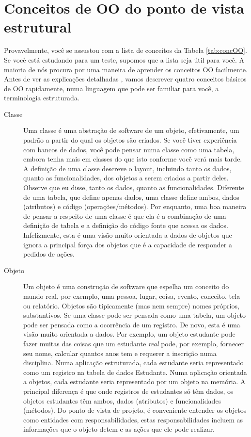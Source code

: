 \documentclass[
	11pt,				%
	openright,
	twoside,			%
	a4paper,			%
	english,			%
	french,
	brazil,				%
	sumario=tradicional
	]{abntex2}
\begin{document}
\section{Conceitos de OO do ponto de vista estrutural}

Provavelmente, você se assustou com a lista de conceitos da Tabela \ref{tab:concOO}. Se você está estudando para um teste, supomos que a lista seja útil para você. A maioria de nós procura por uma maneira de aprender os conceitos OO facilmente. Antes de ver as explicações detalhadas , vamos descrever quatro conceitos básicos de OO rapidamente, numa linguagem que pode ser familiar para você, a terminologia estruturada.

\begin{description}
\item[Classe] Uma classe é uma abstração de software de um objeto, efetivamente, um padrão a partir do qual os objetos são criados. Se você tiver experiência com bancos de dados, você pode pensar numa classe como uma tabela, embora tenha mais em classes do que isto conforme você verá mais tarde. A definição de uma classe descreve o layout, incluindo tanto os dados, quanto as funcionalidades, dos objetos a serem criados a partir deles. Observe que eu disse, tanto os dados, quanto as funcionalidades. Diferente de uma tabela, que define apenas dados, uma classe define ambos, dados (atributos) e código (operações/métodos). Por enquanto, uma boa maneira de pensar a respeito de uma classe é que ela é a combinação de uma definição de tabela e a definição do código fonte que acessa os dados. Infelizmente, esta é uma visão muito orientada a dados de objetos que ignora a principal força dos objetos que é a capacidade de responder a pedidos de ações.

\item[Objeto] Um objeto é uma construção de software que espelha um conceito do mundo real, por exemplo, uma pessoa, lugar, coisa, evento, conceito, tela ou relatório. Objetos são tipicamente (mas nem sempre) nomes próprios, substantivos. Se uma classe pode ser pensada como uma tabela, um objeto pode ser pensada como a ocorrência de um registro. De novo, esta é uma visão muito orientada a dados. Por exemplo, um objeto estudante pode fazer muitas das coisas que um estudante \emph{real} pode, por exemplo, fornecer seu nome, calcular quantos anos tem e requerer a inscrição numa disciplina. Numa aplicação estruturada, cada estudante seria representado como um registro na tabela de dados Estudante. Numa aplicação orientada a objetos, cada estudante seria representado por um objeto na memória. A principal diferença é que onde registros de estudantes só têm dados, os objetos estudantes têm ambos, dados (atributos) e funcionalidades (métodos). Do ponto de vista de projeto, é conveniente entender os objetos como entidades com responsabilidades, estas responsabilidades incluem as informações que o objeto detem e as ações que ele pode realizar.


\end{description}
\end{document}
